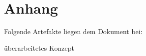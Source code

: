 

\section*{Anhang}
Folgende Artefakte liegen dem Dokument bei:

	überarbeitetes Konzept

  \newpage
  

	